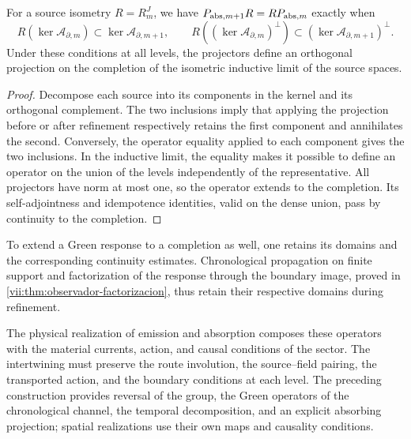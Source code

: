 \begin{proposition}
\label{vii:prop:naturalidad-proyeccion-absorcion}
For a source isometry \(R=R_m^J\), we have
\(P_{{\rm abs},m+1}R=RP_{{\rm abs},m}\) exactly when
\[
 R(\ker\mathcal A_{\partial,m})
       \subset\ker\mathcal A_{\partial,m+1},\qquad
 R((\ker\mathcal A_{\partial,m})^\perp)
       \subset(\ker\mathcal A_{\partial,m+1})^\perp.
\]
Under these conditions at all levels, the projectors define an
orthogonal projection on the completion of the isometric inductive limit
of the source spaces.
\end{proposition}
\begin{proof}
Decompose each source into its components in the kernel and its
orthogonal complement. The two inclusions imply that applying the
projection before or after refinement respectively retains the
first component and annihilates the second. Conversely, the operator
equality applied to each component gives the two inclusions.
In the inductive limit, the equality makes it possible to define an operator on the
union of the levels independently of the representative. All projectors
have norm at most one, so the operator extends to the
completion. Its self-adjointness and idempotence identities, valid on
the dense union, pass by continuity to the completion.
\end{proof}

To extend a Green response to a completion as well, one
retains its domains and the corresponding continuity estimates.
Chronological propagation on finite support and factorization of the
response through the boundary image, proved in
\ref{vii:thm:observador-factorizacion}, thus retain their respective
domains during refinement.

The physical realization of emission and absorption composes these operators with
the material currents, action, and causal conditions of the sector.
The intertwining must preserve the route involution, the source--field
pairing, the transported action, and the boundary conditions at
each level. The preceding construction provides reversal of the group, the
Green operators of the chronological channel, the temporal decomposition, and an explicit
absorbing projection; spatial realizations use their own maps and
causality conditions.
